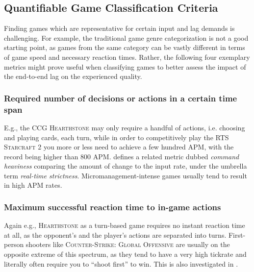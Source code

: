 


\subsection{Quantifiable Game Classification Criteria}

Finding games which are representative for certain input and lag demands is challenging. For example, the traditional game genre categorization is not a good starting point, as games from the same category can be vastly different in terms of game speed and necessary reaction times. Rather, the following four exemplary metrics might prove useful when classifying games to better assess the impact of the end-to-end lag on the experienced quality.

\subsubsection{Required number of decisions or actions in a certain time span} E.g., the \gls{CCG} \textsc{Hearthstone} may only require a handful of actions, i.e. choosing and playing cards, each turn, while in order to competitively play the \gls{RTS} \textsc{Starcraft 2} you more or less need to achieve a few hundred \gls{APM}, with the record being higher than $800$ \gls{APM}. \cite{6404025} defines a related metric dubbed \textit{command heaviness} comparing the amount of change to the input rate, under the umbrella term \textit{real-time strictness}. Micromanagement-intense games usually tend to result in high APM rates.

\subsubsection{Maximum successful reaction time to in-game actions} Again e.g., \textsc{Hearthstone} as a turn-based game requires no instant reaction time at all, as the opponent's and the player's actions are separated into turns. First-person shooters like \textsc{Counter-Strike: Global Offensive} are usually on the opposite extreme of this spectrum, as they tend to have a very high tickrate and literally often require you to ``shoot first'' to win. This is also investigated in \cite{Claypool:2006:LPA:1167838.1167860}.


